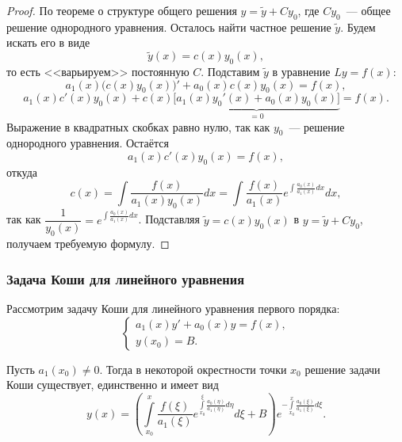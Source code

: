 \documentclass[12pt]{article}
\begin{document}
    \begin{proof}
    	По теореме о структуре общего решения $y = \widetilde{y} + C y_0$, где $C y_0$~--- общее решение однородного уравнения. Осталось найти частное решение $\widetilde{y}$. Будем искать его в виде
    	\[
    		\widetilde{y}(x) = c(x) y_0(x),
    	\]
    	то есть <<варьируем>> постоянную $C$. Подставим $\widetilde{y}$ в уравнение $Ly = f(x)$:
    	\[
    		a_1(x) \bigl( c(x) y_0(x) \bigr)' + a_0(x) c(x) y_0(x) = f(x),
    	\]
    	\[
    		a_1(x) c'(x) y_0(x) + c(x) \underbrace{\bigl[ a_1(x) y_0'(x) + a_0(x) y_0(x) \bigr]}_{= 0} = f(x).
    	\]
    	Выражение в квадратных скобках равно нулю, так как $y_0$~--- решение однородного уравнения. Остаётся
    	\[
    		a_1(x) c'(x) y_0(x) = f(x),
    	\]
    	откуда
    	\[
    		c(x) = \int \dfrac{f(x)}{a_1(x) y_0(x)} dx = \int \dfrac{f(x)}{a_1(x)} e^{\int \frac{a_0(x)}{a_1(x)} dx} dx,
    	\]
    	так как $\dfrac{1}{y_0(x)} = e^{\int \frac{a_0(x)}{a_1(x)} dx}$. Подставляя $\widetilde{y} = c(x) y_0(x)$ в $y = \widetilde{y} + C y_0$, получаем требуемую формулу.
    \end{proof}
    
    \subsubsection{Задача Коши для линейного уравнения}
    
    \noindent
    Рассмотрим задачу Коши для линейного уравнения первого порядка:
    \[
    	\begin{cases}
    		a_1(x) y' + a_0(x) y = f(x), \\
    		y(x_0) = B.
    	\end{cases}
    \]
    
    \begin{statement}
    	Пусть $a_1(x_0) \ne 0$. Тогда в некоторой окрестности точки $x_0$ решение задачи Коши существует, единственно и имеет вид
    	\[
    		y(x) = \left( \int\limits_{x_0}^{x} \dfrac{f(\xi)}{a_1(\xi)} e^{\int\limits_{x_0}^{\xi} \frac{a_0(\eta)}{a_1(\eta)} d\eta} d\xi + B \right) e^{-\int\limits_{x_0}^{x} \frac{a_0(\xi)}{a_1(\xi)} d\xi}.
    	\]
    \end{statement}
    
\end{document}

